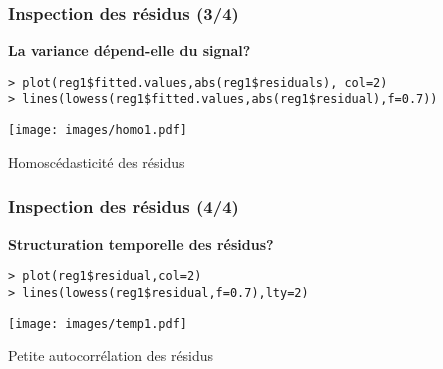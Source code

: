 \documentclass{beamer}
\begin{document}
\begin{frame}[fragile]
\frametitle{\bf Inspection des r\'esidus (3/4)}
{\bf La variance d\'epend-elle du signal?}
\begin{small}
\begin{verbatim}
> plot(reg1$fitted.values,abs(reg1$residuals), col=2)
> lines(lowess(reg1$fitted.values,abs(reg1$residual),f=0.7))
\end{verbatim}
\end{small}

\vspace{-0.8cm}
\begin{center}
\texttt{[image: images/homo1.pdf]}

Homosc\'edasticit\'e des r\'esidus
\end{center}
\end{frame}



\begin{frame}[fragile]
\frametitle{\bf Inspection des r\'esidus (4/4)}
{\bf Structuration temporelle des r\'esidus?}
\begin{small}
\begin{verbatim}
> plot(reg1$residual,col=2)
> lines(lowess(reg1$residual,f=0.7),lty=2)
\end{verbatim}
\end{small}

\vspace{-0.8cm}
\begin{center}
\texttt{[image: images/temp1.pdf]}

Petite autocorr\'elation des r\'esidus
\end{center}
\end{frame}
\end{document}
